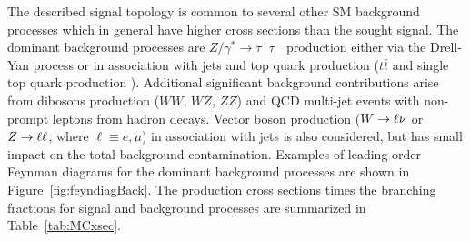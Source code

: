 The described signal topology  is common to several other  SM background  processes which in general  
have higher cross sections than the sought signal.
The dominant background processes are  $Z/\gamma^* \rightarrow \tau^+ \tau^- $ production
either via the  Drell-Yan process or in association with jets and  top quark production ($t\bar{t}$ and single top quark production ). 
Additional significant background contributions arise from  dibosons production 
($WW$, $WZ$, $ZZ$) and QCD multi-jet events with non-prompt leptons  from hadron decays.
Vector boson production ($W\rightarrow \ell \nu$ or $Z\rightarrow \ell \ell$, where $\ell \equiv e,\mu$)  in association with jets 
is also considered, but has small impact on the total background contamination. Examples of 
leading order Feynman diagrams for the dominant background processes are shown in Figure~\ref{fig:feyndiagBack}.
The production cross sections times the branching fractions for signal and background processes are summarized in
Table~\ref{tab:MCxsec}. 
%

